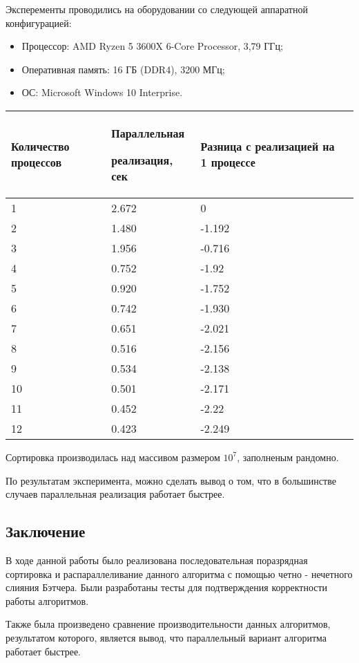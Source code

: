 \documentclass{report}
\begin{document}
Эксперементы проводились на оборудовании со следующей аппаратной конфигурацией:
\begin{itemize}
\item Процессор: AMD Ryzen 5 3600X 6-Core Processor, 3,79 ГГц;
\item Оперативная память: 16 ГБ (DDR4), 3200 МГц;
\item ОС: Microsoft Windows 10 Interprise.
\end{itemize}
\begin{table}[h]
    \begin{tabular}{ | p{4cm} | p{4cm} | p{4cm} | p{4cm} | }
    \hline
    Количество процессов & Параллельная \par реализация, сек & Разница с реализацией на 1 процессе\\ \hline
    1    & 2.672  &0 \\ \hline
    2    & 1.480  &-1.192 \\ \hline
    3    & 1.956  &-0.716 \\ \hline
    4    & 0.752  &-1.92 \\ \hline
    5    & 0.920  &-1.752 \\ \hline 
    6    & 0.742  &-1.930 \\ \hline
    7    & 0.651  &-2.021 \\ \hline
    8    & 0.516  &-2.156 \\ \hline
    9    & 0.534  &-2.138 \\ \hline
    10   & 0.501  &-2.171 \\ \hline
    11   & 0.452  &-2.22 \\ \hline
    12   & 0.423  &-2.249 \\ \hline
    \end{tabular}
\end{table}
\par Сортировка производилась над массивом размером $10^7$, заполненым рандомно.
\par По результатам эксперимента, можно сделать вывод о том, что в большинстве случаев параллельная реализация работает быстрее.

\newpage
\begin{center}
\section*{Заключение}
\end{center}

В ходе данной работы было реализована последовательная поразрядная сортировка и распараллеливание данного алгоритма с помощью четно - нечетного слияния Бэтчера. Были разработаны тесты для подтверждения корректности работы алгоритмов.
\par Также была произведено сравнение производительности данных алгоритмов, результатом которого, является вывод, что параллельный вариант алгоритма работает быстрее.
\end{document}
